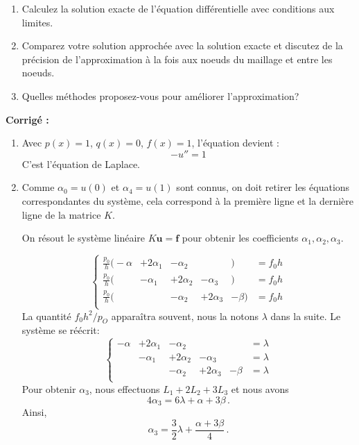 \documentclass[a4paper,12pt]{article}
\newif\ifcorriges
\newenvironment{solution}
  {
    \ifcorriges
      \begin{framed}
      \par\noindent\textbf{Corrigé :} 
  }
  {
      \end{framed}
    \fi
  }
\begin{document}
\begin{enumerate}
\begin{enumerate}
        \item Calculez la solution exacte de l'équation différentielle avec conditions aux limites.
        
        \item Comparez votre solution approchée avec la solution exacte et discutez de la précision de l'approximation à la fois aux noeuds du maillage et entre les noeuds. 
        
        \item Quelles méthodes proposez-vous pour améliorer l'approximation?
    \end{enumerate}
\ifcorriges
        \begin{solution}

        \begin{enumerate}
            \item Avec \( p(x) = 1 \), \( q(x) = 0 \), \( f(x) = 1 \), l'équation devient :
            \[
            -u'' = 1
            \]
            C'est l'équation de Laplace. 

            \item Comme $\alpha_0 = u(0)$ et $\alpha_4 = u(1)$ sont connus, on doit retirer les équations correspondantes du système, cela correspond à la première ligne et la dernière ligne de la matrice $K$.
            
            On résout le système linéaire $K \mathbf{u} = \mathbf{f}$ pour obtenir les coefficients $\alpha_1, \alpha_2, \alpha_3$.

            \[
            \left\{
            \begin{array}{cccccc}
                 \frac{p_0}{h}\Big(- \alpha & +  2 \alpha_1 &- \alpha_2 & & \Big)  &=  f_0 h \\
                 \frac{p_0}{h}\Big( & - \alpha_1 &+  2 \alpha_2& - \alpha_3 &\Big)  &=  f_0 h \\
                 \frac{p_0}{h}\Big(  & & - \alpha_2 &+  2 \alpha_3 &- \beta\Big)  &=  f_0 h \\
            \end{array}
            \right.
            \]
            La quantité $f_0 h^2/p_O$ apparaîtra souvent, nous la notons $\lambda$ dans la suite. Le système se réécrit:
            \[
                \left\{
                    \begin{array}{cccccc}
                         - \alpha &+ 2 \alpha_1 &- \alpha_2 & & &=  \lambda \\
                         & - \alpha_1 &+ 2 \alpha_2 &- \alpha_3  & &=  \lambda \\
                         & & - \alpha_2 &+ 2 \alpha_3 &- \beta &= \lambda \\
                    \end{array}
                    \right.
            \]
             Pour obtenir $\alpha_3$, nous effectuons $L_1+2L_2+3L_3$ et nous avons
             \[
             4 \alpha_3 = 6 \lambda + \alpha + 3 \beta\,.
             \]
             Ainsi, 
             \[
             \alpha_3 = \frac{3}{2}\lambda + \frac{\alpha +3\beta}{4}\,.
             \]


\end{enumerate}
\end{solution}
\end{enumerate}
\end{document}
